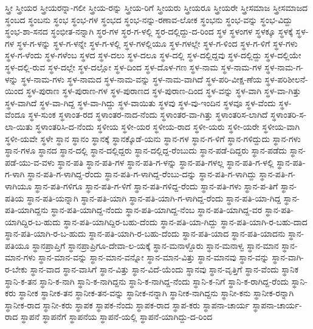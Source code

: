 ಸ್ತ್ರೀ
ಸ್ತ್ರೀಯರ
ಸ್ತ್ರೀಯರನ್ನಾ-ಗಲೀ
ಸ್ತ್ರೀಯ-ರನ್ನು
ಸ್ತ್ರೀಯ-ರಿಗೆ
ಸ್ತ್ರೀಯರು
ಸ್ತ್ರೀಯರೂ
ಸ್ತ್ರೀಯರೇ
ಸ್ತ್ರೀಸಮಾಜ
ಸ್ತ್ರೀಸಮಾಜದ
ಸ್ಥಂಬದ
ಸ್ಥಂಬನು
ಸ್ಥಂಭ
ಸ್ಥಂಭ-ಗಳ
ಸ್ಥಂಭದ
ಸ್ಥಂಭ-ನನ್ನು-ರಣಾವ-ಲೋಕ
ಸ್ಥಂಭನು
ಸ್ಥಂಭ-ವನ್ನು
ಸ್ಥಂಭ-ವಿದ್ದು
ಸ್ಥಂಭ-ಶಾ-ಸನದ
ಸ್ಥಂಭೀತ-ನನ್ನಾಗಿ
ಸ್ಥರ-ಗಳ
ಸ್ಥರ-ಗ-ಳಲ್ಲಿ
ಸ್ಥರ-ದಲ್ಲಿದ್ದು-ದ-ರಿಂದ
ಸ್ಥಳ
ಸ್ಥಳಂಗಳ
ಸ್ಥಳಕ್ಕೂ
ಸ್ಥಳಕ್ಕೆ
ಸ್ಥಳ-ಗಳ
ಸ್ಥಳ-ಗ-ಳನ್ನು
ಸ್ಥಳ-ಗ-ಳನ್ನೇ
ಸ್ಥಳ-ಗ-ಳಲ್ಲಿ
ಸ್ಥಳ-ಗಳಲ್ಲಿಯೂ
ಸ್ಥಳ-ಗಳಲ್ಲೇ
ಸ್ಥಳ-ಗ-ಳಿಂದ
ಸ್ಥಳ-ಗ-ಳಿಗೆ
ಸ್ಥಳ-ಗಳು
ಸ್ಥಳ-ಗ-ಳೆಂದು
ಸ್ಥಳ-ಗಳೆಂಬ
ಸ್ಥಳದ
ಸ್ಥಳ-ದಲು
ಸ್ಥಳ-ದಲೂ
ಸ್ಥಳ-ದಲ್ಲಿ
ಸ್ಥಳ-ದಲ್ಲಿದ್ದವು
ಸ್ಥಳ-ದಲ್ಲಿದ್ದು
ಸ್ಥಳ-ದಲ್ಲಿಯೇ
ಸ್ಥಳ-ದಲ್ಲಿ-ರುವ
ಸ್ಥಳ-ದಲ್ಲೇ
ಸ್ಥಳ-ದಲ್ಲೋ
ಸ್ಥಳ-ದಿಂದ
ಸ್ಥಳ-ದೊಳ-ಗಣ
ಸ್ಥಳ-ನಾಮ
ಸ್ಥಳ-ನಾಮ-ಗಳ
ಸ್ಥಳ-ನಾಮ-ಗ-ಳನ್ನು
ಸ್ಥಳ-ನಾಮ-ಗಳು
ಸ್ಥಳ-ನಾಮದ
ಸ್ಥಳ-ನಾಮ-ವನ್ನು
ಸ್ಥಳ-ನಾಮ-ವಾಗಿದೆ
ಸ್ಥಳ-ಪರಿ-ವೀಕ್ಷ-ಣೆಯ
ಸ್ಥಳ-ಪರಿಶೀಲನೆ-ಯಿಂದ
ಸ್ಥಳ-ಪುರಾಣ
ಸ್ಥಳ-ಪುರಾಣ-ಗಳ
ಸ್ಥಳ-ಪುರಾಣದ
ಸ್ಥಳ-ಪುರಾಣ-ದಿಂದ
ಸ್ಥಳ-ವನ್ನು
ಸ್ಥಳ-ವಾಗಿ
ಸ್ಥಳ-ವಾ-ಗಿತ್ತು
ಸ್ಥಳ-ವಾಗಿದೆ
ಸ್ಥಳ-ವಾ-ಗಿದ್ದ
ಸ್ಥಳ-ವಾ-ಗಿದ್ದು
ಸ್ಥಳ-ವಾಯಿತು
ಸ್ಥಳವು
ಸ್ಥಳ-ವು-ಇಂದಿನ
ಸ್ಥಳವೂ
ಸ್ಥಳ-ವೆಂದು
ಸ್ಥಳ-ವೆಂದೂ
ಸ್ಥಳ-ಸುಂಕ
ಸ್ಥಳಾಂತ-ರದ
ಸ್ಥಳಾಂತರ-ನಾದ-ನೆಂದು
ಸ್ಥಳಾಂತರ-ವಾ-ಗಿತ್ತು
ಸ್ಥಳಾಂತರಿಸ-ಲಾಗಿದೆ
ಸ್ಥಳಾಂತರಿ-ಸ-ಲಾ-ಯಿತು
ಸ್ಥಳಾಂತರಿಸಿ-ದ-ನೆಂದು
ಸ್ಥಳೀಯ
ಸ್ಥಳೀ-ಯರ
ಸ್ಥಳೀಯ-ರಾದ
ಸ್ಥಳೀ-ಯರು
ಸ್ಥಳೀ-ಯರೇ
ಸ್ಥಳೀಯ-ವಾಗಿ
ಸ್ಥಳೀ-ಯವೇ
ಸ್ಥಳೇ
ಸ್ಥಾನ
ಸ್ಥಾನಂ
ಸ್ಥಾನಕ್ಕೆ
ಸ್ಥಾನಕ್ಕೊಡೆ-ಯನು
ಸ್ಥಾನ-ಗಳ
ಸ್ಥಾನ-ಗ-ಳಿಗೆ
ಸ್ಥಾನ-ಗಳಿದ್ದುದು
ಸ್ಥಾನ-ಗಳು
ಸ್ಥಾನ-ಗಳೂ
ಸ್ಥಾನದ
ಸ್ಥಾನ-ದಲ್ಲಿ
ಸ್ಥಾನ-ದಲ್ಲಿದ್ದರು
ಸ್ಥಾನ-ದಲ್ಲಿದ್ದ-ರೆಂಬುದು
ಸ್ಥಾನ-ಪಡೆ-ದಿದ್ದರು
ಸ್ಥಾನ-ಪಡೆದು
ಸ್ಥಾನ-ಪಡೆ-ಯು-ವ-ವಳು
ಸ್ಥಾನ-ಪತಿ
ಸ್ಥಾನ-ಪತಿ-ಗಳ
ಸ್ಥಾನ-ಪತಿ-ಗ-ಳನ್ನು
ಸ್ಥಾನ-ಪತಿ-ಗಳಲ್ಲ
ಸ್ಥಾನ-ಪತಿ-ಗ-ಳಲ್ಲಿ
ಸ್ಥಾನ-ಪತಿ-ಗ-ಳಾಗಿ
ಸ್ಥಾನ-ಪತಿ-ಗ-ಳಾಗಿದ್ದ-ರೆಂದು
ಸ್ಥಾನ-ಪತಿ-ಗ-ಳಾಗಿದ್ದ-ರೆಂಬು-ದನ್ನು
ಸ್ಥಾನ-ಪತಿ-ಗ-ಳಾಗಿದ್ದು
ಸ್ಥಾನ-ಪತಿ-ಗ-ಳಾಗಿಯೂ
ಸ್ಥಾನ-ಪತಿ-ಗಳಿಗೂ
ಸ್ಥಾನ-ಪತಿ-ಗ-ಳಿಗೆ
ಸ್ಥಾನ-ಪತಿ-ಗಳಿದ್ದ-ರೆಂದು
ಸ್ಥಾನ-ಪತಿ-ಗಳು
ಸ್ಥಾನ-ಪ-ತಿಗೆ
ಸ್ಥಾನ-ಪತಿಯ
ಸ್ಥಾನ-ಪತಿ-ಯನ್ನಾಗಿ
ಸ್ಥಾನ-ಪತಿ-ಯಾಗಿ
ಸ್ಥಾನ-ಪತಿ-ಯಾಗಿ-ಗ-ಳಾಗಿದ್ದ-ರೆಂದು
ಸ್ಥಾನ-ಪತಿ-ಯಾ-ಗಿದ್ದ
ಸ್ಥಾನ-ಪತಿ-ಯಾಗಿದ್ದನು
ಸ್ಥಾನ-ಪತಿ-ಯಾಗಿದ್ದ-ನೆಂದು
ಸ್ಥಾನ-ಪತಿ-ಯಾಗಿದ್ದ-ನೆಂಬ
ಸ್ಥಾನ-ಪತಿ-ಯಾಗಿದ್ದ-ವರ
ಸ್ಥಾನ-ಪತಿ-ಯಾಗಿದ್ದಿರ-ಬ-ಹುದು
ಸ್ಥಾನ-ಪತಿ-ಯಾಗಿದ್ದಿರ-ಬಹು-ದೆಂದು
ಸ್ಥಾನ-ಪತಿ-ಯಾ-ಗಿದ್ದು
ಸ್ಥಾನ-ಪತಿ-ಯಾಗಿ-ರ-ಬಹು-ದಾದ
ಸ್ಥಾನ-ಪತಿ-ಯಾಗಿ-ರ-ಬ-ಹುದು
ಸ್ಥಾನ-ಪತಿ-ಯಾಗಿ-ರ-ಬಹು-ದೆಂದು
ಸ್ಥಾನ-ಪತಿ-ಯಾದ
ಸ್ಥಾನ-ಪತಿ-ಯಾದನು
ಸ್ಥಾನ-ಪತಿಯೂ
ಸ್ಥಾನಪ್ರಾಪ್ತಿಗೆ
ಸ್ಥಾನಪ್ರಾಪ್ರಿಗೂ-ದೇವಾ-ಲ-ಯಕ್ಕೆ
ಸ್ಥಾನ-ಮನಾಳ್ದೊರು
ಸ್ಥಾನ-ಮನಾಳ್ವ
ಸ್ಥಾನ-ಮಾನ
ಸ್ಥಾನ-ಮಾನ-ಗಳು
ಸ್ಥಾನ-ಮಾನ-ವನ್ನು
ಸ್ಥಾನ-ಮಾನ-ವನ್ನೋ
ಸ್ಥಾನ-ಮಾನ-ವಿತ್ತು
ಸ್ಥಾನ-ಮಾನವು
ಸ್ಥಾನ-ವನ್ನು
ಸ್ಥಾನ-ವಾಗಿ-ರ-ಬೇಕು
ಸ್ಥಾನ-ವಾದ
ಸ್ಥಾನ-ವಾಸಿಗೆ
ಸ್ಥಾನ-ವಿತ್ತು
ಸ್ಥಾನ-ವಿದೆ-ಯೆಂದು
ಸ್ಥಾನವು
ಸ್ಥಾನ-ವೃತ್ತಿಗೆ
ಸ್ಥಾನ-ವೆಂದು
ಸ್ಥಾನಿಕ
ಸ್ಥಾನಿ-ಕ-ತನ
ಸ್ಥಾನಿ-ಕ-ನಾಗಿ
ಸ್ಥಾನಿ-ಕ-ನಾಗಿದ್ದನು
ಸ್ಥಾನಿ-ಕ-ನಾಗಿದ್ದ-ನೆಂದು
ಸ್ಥಾನಿ-ಕ-ನಿಗೆ
ಸ್ಥಾನಿ-ಕ-ರಾಗಿದ್ದ-ರೆಂದು
ಸ್ಥಾನಿ-ಕರು
ಸ್ಥಾನೀಕ
ಸ್ಥಾನೀಕ-ತನ
ಸ್ಥಾನೀಕ-ತನ-ವನ್ನು
ಸ್ಥಾನೀಕ-ನನ್ನಾಗಿ
ಸ್ಥಾನೀಕ-ನಾಗಿದ್ದನು
ಸ್ಥಾನೀ-ಕನು
ಸ್ಥಾನೀಕ-ರನ್ನಾಗಿ
ಸ್ಥಾನೀಕ-ರಾದ
ಸ್ಥಾನೀ-ಕರು
ಸ್ಥಾಪಕ
ಸ್ಥಾಪಕ-ನೆಂದು
ಸ್ಥಾಪಕ-ರಾದ
ಸ್ಥಾಪ-ಕರು
ಸ್ಥಾಪನಾ-ಚಾರ್ಯ
ಸ್ಥಾಪನಾ-ಚಾರ್ಯ-ರಾದ
ಸ್ಥಾಪನೆ
ಸ್ಥಾಪನೆಗೆ
ಸ್ಥಾಪನೆಯ
ಸ್ಥಾಪನೆ-ಯಲ್ಲಿ
ಸ್ಥಾಪನೆ-ಯಾಗಿದ್ದು-ದ-ರಿಂದ
